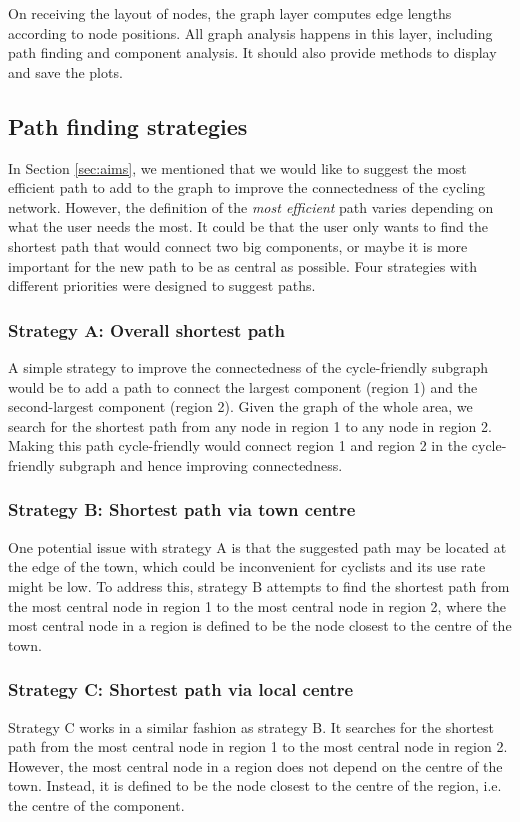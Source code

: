 \documentclass[12pt,a4paper]{report}
\begin{document}
On receiving the layout of nodes, the graph layer computes edge lengths according to node positions. All graph analysis happens in this layer, including path finding and component analysis. It should also provide methods to display and save the plots.

\subsection{Path finding strategies} \label{sec:strategies}
In Section \ref{sec:aims}, we mentioned that we would like to suggest the most efficient path to add to the graph to improve the connectedness of the cycling network. However, the definition of the \textit{most efficient} path varies depending on what the user needs the most. It could be that the user only wants to find the shortest path that would connect two big components, or maybe it is more important for the new path to be as central as possible. Four strategies with different priorities were designed to suggest paths.

\subsubsection*{Strategy A: Overall shortest path}
A simple strategy to improve the connectedness of the cycle-friendly subgraph would be to add a path to connect the largest component (region 1) and the second-largest component (region 2). Given the graph of the whole area, we search for the shortest path from any node in region 1 to any node in region 2. Making this path cycle-friendly would connect region 1 and region 2 in the cycle-friendly subgraph and hence improving connectedness.

\subsubsection*{Strategy B: Shortest path via town centre}
One potential issue with strategy A is that the suggested path may be located at the edge of the town, which could be inconvenient for cyclists and its use rate might be low. To address this, strategy B attempts to find the shortest path from the most central node in region 1 to the most central node in region 2, where the most central node in a region is defined to be the node closest to the centre of the town.

\subsubsection*{Strategy C: Shortest path via local centre}
Strategy C works in a similar fashion as strategy B. It searches for the shortest path from the most central node in region 1 to the most central node in region 2. However, the most central node in a region does not depend on the centre of the town. Instead, it is defined to be the node closest to the centre of the region, i.e. the centre of the component.
\end{document}
